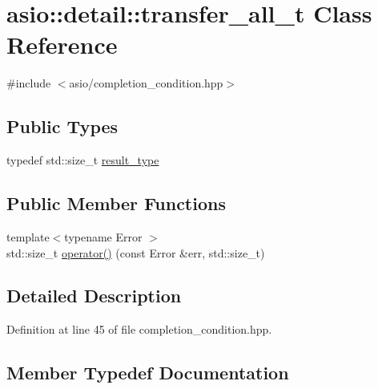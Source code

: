 \hypertarget{classasio_1_1detail_1_1transfer__all__t}{}\section{asio\+:\+:detail\+:\+:transfer\+\_\+all\+\_\+t Class Reference}
\label{classasio_1_1detail_1_1transfer__all__t}


{\ttfamily \#include $<$asio/completion\+\_\+condition.\+hpp$>$}

\subsection*{Public Types}
\begin{DoxyCompactItemize}
\item 
typedef std\+::size\+\_\+t \hyperlink{classasio_1_1detail_1_1transfer__all__t_ac9caf0d570cd8433034264291b473f9c}{result\+\_\+type}
\end{DoxyCompactItemize}
\subsection*{Public Member Functions}
\begin{DoxyCompactItemize}
\item 
{\footnotesize template$<$typename Error $>$ }\\std\+::size\+\_\+t \hyperlink{classasio_1_1detail_1_1transfer__all__t_a456f0763427a94cd8475fc18f57bc851}{operator()} (const Error \&err, std\+::size\+\_\+t)
\end{DoxyCompactItemize}


\subsection{Detailed Description}


Definition at line 45 of file completion\+\_\+condition.\+hpp.



\subsection{Member Typedef Documentation}
\hypertarget{classasio_1_1detail_1_1transfer__all__t_ac9caf0d570cd8433034264291b473f9c}{}
